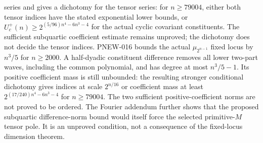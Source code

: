\documentclass[11pt]{article}
\theoremstyle{definition}\newtheorem{definition}[theorem]{Definition}
\theoremstyle{remark}\newtheorem{remark}[theorem]{Remark}
\begin{document}
series and gives a dichotomy for the tensor series: for $n\ge79004$,
either both tensor indices have the stated exponential lower bounds,
or $U_c^+(n)\ge 2^{(5/96)n^4-6n^3-4}$ for the actual cyclic covariant
constituents. The sufficient subquartic coefficient estimate remains
unproved; the dichotomy does not decide the tensor indices.
PNEW-016 bounds the actual $\mu_{2^{n-1}}$ fixed locus by
$n^3/5$ for $n\ge2000$. A half-dyadic constituent difference
removes all lower two-part waves, including the common polynomial,
and has degree at most $n^3/5-1$. Its positive coefficient mass is
still unbounded: the resulting stronger conditional dichotomy gives
indices at scale $2^{n/16}$ or coefficient mass at least
$2^{(17/240)n^4-6n^3-4}$ for $n\ge79004$.
The two sufficient positive-coefficient norms are not proved to be
ordered. The Fourier addendum further shows that the proposed
subquartic difference-norm bound would itself force the selected
primitive-$M$ tensor pole. It is an unproved condition, not a
consequence of the fixed-locus dimension theorem.
\end{document}
